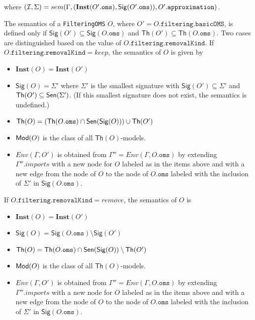 \documentclass[10pt,fleqn,final]{scrreprt}
\newcommand*{\syntax}[1]{\texttt{#1}}
\newcommand{\Sig}{\mathsf{Sig}}
\renewcommand{\Th}{\mathsf{Th}}
\newcommand{\Inst}{\ensuremath{\mathbf{Inst}}}
\newenvironment{definitions}[0]{\medskip }{}
\begin{document}
\begin{definitions}
\noindent where $(\cI,\Sigma) = sem(\Gamma, (\Inst(O'.\syntax{oms}), \Sig(O'.\syntax{oms})), O'.\syntax{approximation})$.

The semantics of a \syntax{FilteringOMS} $O$, where
$O' = O.\syntax{filtering}.\syntax{basicOMS}$,
is
defined only if  $\Sig(O')\subseteq\Sig(O.\syntax{oms})$ and 
$\Th(O')\subseteq\Th(O.\syntax{oms})$.
 Two cases are distinguished based on the value of $O.\syntax{filtering}.\syntax{removalKind}$.
If $O.\syntax{filtering}.\syntax{removalKind} = keep$, 
the semantics of $O$ is given by
\begin{itemize}
  \item $\Inst(O) = \Inst(O')$
  \item $\Sig(O) = \Sigma'$ where $\Sigma'$ is the smallest signature
with $\Sig(O')\subseteq\Sigma'$ and $\Th(O')\subseteq\Sen(\Sigma')$. ({If this smallest signature does not exist, the semantics is undefined.})
  \item $\Th(O) = (\Th(O.\syntax{oms})\cap\Sen(\Sig(O)))\cup\Th(O')$
  \item $\mathsf{Mod}(O)$ is the class of all $\Th(O)$-models.
  \item $Env(\Gamma, O')$ is obtained from 
       $\Gamma'' = Env(\Gamma, O.\syntax{oms})$
       by extending $\Gamma''.imports$
       with a new node for $O$ labeled as in the items above and
       with a new edge from the node of $O$ to the node of $O.\syntax{oms}$
        labeled with the inclusion of $\Sigma'$ in $\Sig(O.\syntax{oms})$.
\end{itemize}

\noindent
If $O.\syntax{filtering}.\syntax{removalKind} = remove$, the semantics of $O$  
is
\begin{itemize}
  \item $\Inst(O) = \Inst(O')$
  \item $\Sig(O) = \Sig(O.\syntax{oms})\setminus \Sig(O')$ 
  \item $\Th(O) = \Th(O.\syntax{oms})\cap\Sen(\Sig(O))\setminus\Th(O')$
  \item $\mathsf{Mod}(O)$ is the class of all $\Th(O)$-models.
    \item $Env(\Gamma, O')$ is obtained from 
       $\Gamma'' = Env(\Gamma, O.\syntax{oms})$
       by extending $\Gamma''.imports$
       with a new node for $O$ labeled as in the items above and
       with a new edge from the node of $O$ to the node of $O.\syntax{oms}$
        labeled with the inclusion of $\Sigma'$ in $\Sig(O.\syntax{oms})$.
\end{itemize}


\end{definitions}
\end{document}
